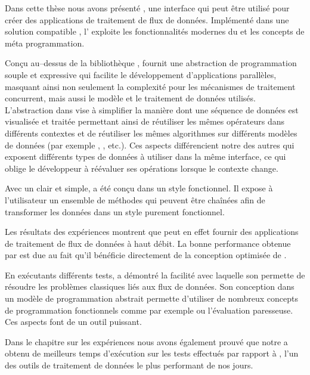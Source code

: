 
\begin{conclusion}
\label{conclusion.chap}

Dans cette th\`ese nous avons pr\'esent\'e , une interface qui peut \^etre utilis\'e pour cr\'eer des applications de traitement de flux de donn\'ees. Impl\'ement\'e dans une solution compatible , l' exploite les fonctionnalit\'es modernes du  et les concepts de m\'eta programmation.

Con\c cu au--dessus de la biblioth\`eque ,  fournit une abstraction de programmation souple et expressive qui facilite le d\'eveloppement d'applications parall\`eles, masquant ainsi non seulement la complexit\'e pour les m\'ecanismes de traitement concurrent, mais aussi le mod\`ele et le traitement de donn\'ees utilis\'es. L'abstraction dans  vise \`a simplifier la mani\`ere dont une s\'equence de donn\'ees est visualis\'ee et trait\'ee permettant ainsi de r\'eutiliser les m\^emes op\'erateurs dans diff\'erents contextes et de r\'eutiliser les m\^emes algorithmes sur diff\'erents mod\`eles de donn\'ees (par exemple , ,  etc.). Ces aspects diff\'erencient notre  des autres  qui exposent diff\'erents types de donn\'ees \`a utiliser dans la m\^eme interface, ce qui oblige le d\'eveloppeur \`a r\'e\'evaluer ses op\'erations lorsque le contexte change.

Avec un  clair et simple,  a \'et\'e con\c cu dans un style fonctionnel. Il expose \`a l'utilisateur un ensemble de m\'ethodes qui peuvent \^etre cha\^in\'ees afin de transformer les donn\'ees dans un style purement fonctionnel.


Les r\'esultats des exp\'eriences montrent que  peut en effet fournir des applications de traitement de flux de donn\'ees \`a haut d\'ebit. La bonne performance obtenue par  est due au fait qu'il b\'en\'eficie directement de la conception optimis\'ee de .

En ex\'ecutants diff\'erents tests,  a d\'emontr\'e la facilit\'e avec laquelle son  permette de r\'esoudre les probl\`emes classiques li\'es aux flux de donn\'ees. Son conception dans un mod\`ele de programmation abstrait permette d'utiliser de nombreux concepts de programmation fonctionnels comme par exemple  ou l'\'evaluation paresseuse. Ces aspects font de  un outil puissant.

Dans le chapitre sur les exp\'eriences nous avons \'egalement prouv\'e que notre  a obtenu de meilleurs temps d'ex\'ecution sur les tests effectu\'es par rapport \`a , l'un des outils de traitement de donn\'ees le plus performant de nos jours.


\end{conclusion}
